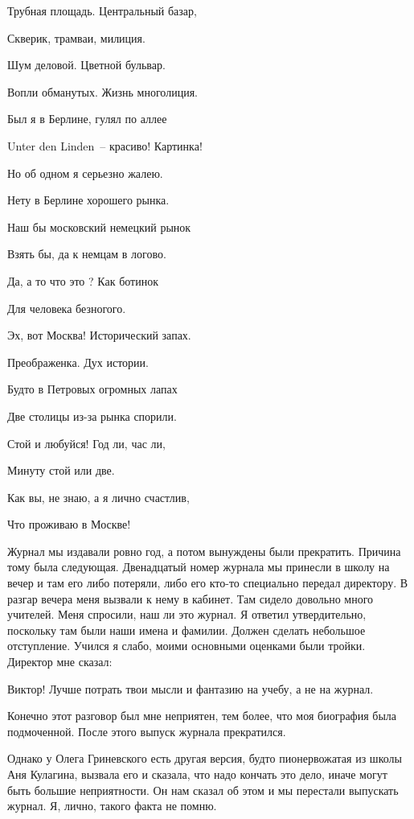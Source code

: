 {\itshape

Трубная площадь. Центральный базар,

Скверик, трамваи, милиция.

Шум деловой. Цветной бульвар.

Вопли обманутых. Жизнь многолиция.

\indent

Был я в Берлине, гулял по аллее 

Unter den Linden~-- красиво! Картинка!

Но об одном я серьезно жалею.

Нету в Берлине хорошего рынка.

\indent

Наш бы московский немецкий рынок 

Взять бы, да к немцам в логово.

Да, а то что это ? Как ботинок 

Для человека безногого.


\indent

Эх, вот Москва! Исторический запах. 

Преображенка. Дух истории.

Будто в Петровых огромных лапах 

Две столицы из-за рынка спорили.

\indent

Стой и любуйся! Год ли, час ли,

Минуту стой или две.

Как вы, не знаю, а я лично счастлив,

Что проживаю в Москве!
}
\indent

Журнал мы издавали ровно год, а потом вынуждены были прекратить. Причина тому была следующая. Двенадцатый номер журнала мы принесли в школу на вечер и там его либо потеряли, либо его кто-то специально передал директору. В разгар вечера меня вызвали к нему в кабинет. Там сидело довольно много учителей. Меня спросили, наш ли это журнал. Я ответил утвердительно, поскольку там были наши имена и фамилии. Должен сделать небольшое отступление. Учился я слабо, моими основными оценками были тройки. Директор мне сказал:

Виктор! Лучше потрать твои мысли и фантазию на учебу, а не на журнал.

Конечно этот разговор был мне неприятен, тем более, что моя биография была подмоченной. После этого выпуск журнала прекратился.

Однако у Олега Гриневского есть другая версия, будто пионервожатая из школы Аня Кулагина, вызвала его и сказала, что надо кончать это дело, иначе могут быть большие неприятности. Он нам сказал об этом и мы перестали выпускать журнал. Я, лично, такого факта не помню.

